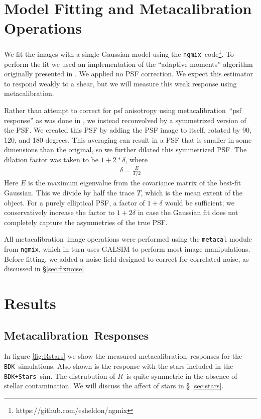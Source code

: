 \documentclass[a4paper,fleqn,usenatbib]{mnras}
\newcommand{\mcal}{metacalibration}
\newcommand{\Mcal}{Metacalibration}
\newcommand{\mcalR}{$R$}
\newcommand{\ngmix}{\texttt{ngmix}}
\newcommand{\bdsim}{\texttt{BDK}}
\newcommand{\bdstar}{\texttt{BDK+Stars}}
\begin{document}
\section{Model Fitting and Metacalibration Operations} \label{sec:modelfit}

We fit the images with a single Gaussian model using the \ngmix\
code\footnote{https://github.com/esheldon/ngmix}.  To perform the fit we used an
implementation of the ``adaptive moments'' algorithm originally presented in
\cite{bj02}.   We applied no PSF correction.  We expect this estimator to
respond weakly to a shear, but we will measure this weak response using \mcal.

Rather than attempt to correct for psf anisotropy using \mcal\ ``psf response''
as was done in \cite{HuffMcal}, we instead reconvolved by a symmetrized version
of the PSF. We created this PSF by adding the PSF image to itself, rotated by
90, 120, and 180 degrees.  This averaging can result in a PSF that is smaller
in some dimensions than the original, so we further dilated this symmetrized
PSF.  The dilation factor was taken to be $1+2*\delta$, where
\begin{align}
    \delta = \frac{E}{T/2}
\end{align}
Here $E$ is the maximum eigenvalue from the covariance matrix of the best-fit
Gaussian. This we divide by half the trace $T$, which is the mean extent of the
object.  For a purely elliptical PSF, a factor of $1+\delta$ would be
sufficient; we conservatively increase the factor to $1+2\delta$ in case the
Gaussian fit does not completely capture the asymmetries of the true PSF.

All \mcal\ image operations were performed using the \texttt{metacal} module
from \ngmix, which in turn uses GALSIM to perform most image manipulations.
Before fitting, we added a noise field designed to correct for correlated
noise, as discussed in \S \ref{sec:fixnoise}


\section{Results} \label{sec:results}


\subsection{\Mcal\ Responses}

In figure \ref{fig:Rstars} we show the measured \mcal\ responses for the
\bdsim\  simulations.  Also shown is the response with the stars included in
the \bdstar\ sim.  The distrubution of \mcalR\ is quite symmetric in the
absence of stellar contamination.  We will discuss the affect of stars in \S
\ref{sec:stars}.
\end{document}
